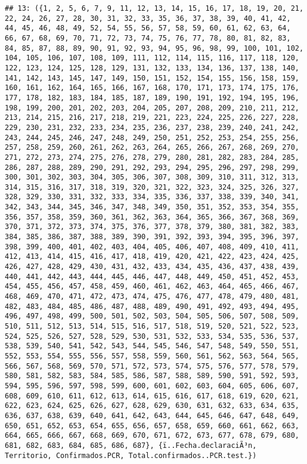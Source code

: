 \documentclass[
]{book}
\begin{document}
\begin{verbatim}
## 13: ({1, 2, 5, 6, 7, 9, 11, 12, 13, 14, 15, 16, 17, 18, 19, 20, 21, 22, 24, 26, 27, 28, 30, 31, 32, 33, 35, 36, 37, 38, 39, 40, 41, 42, 44, 45, 46, 48, 49, 52, 54, 55, 56, 57, 58, 59, 60, 61, 62, 63, 64, 66, 67, 68, 69, 70, 71, 72, 73, 74, 75, 76, 77, 78, 80, 81, 82, 83, 84, 85, 87, 88, 89, 90, 91, 92, 93, 94, 95, 96, 98, 99, 100, 101, 102, 104, 105, 106, 107, 108, 109, 111, 112, 114, 115, 116, 117, 118, 120, 122, 123, 124, 125, 128, 129, 131, 132, 133, 134, 136, 137, 138, 140, 141, 142, 143, 145, 147, 149, 150, 151, 152, 154, 155, 156, 158, 159, 160, 161, 162, 164, 165, 166, 167, 168, 170, 171, 173, 174, 175, 176, 177, 178, 182, 183, 184, 185, 187, 189, 190, 191, 192, 194, 195, 196, 198, 199, 200, 201, 202, 203, 204, 205, 207, 208, 209, 210, 211, 212, 213, 214, 215, 216, 217, 218, 219, 221, 223, 224, 225, 226, 227, 228, 229, 230, 231, 232, 233, 234, 235, 236, 237, 238, 239, 240, 241, 242, 243, 244, 245, 246, 247, 248, 249, 250, 251, 252, 253, 254, 255, 256, 257, 258, 259, 260, 261, 262, 263, 264, 265, 266, 267, 268, 269, 270, 271, 272, 273, 274, 275, 276, 278, 279, 280, 281, 282, 283, 284, 285, 286, 287, 288, 289, 290, 291, 292, 293, 294, 295, 296, 297, 298, 299, 300, 301, 302, 303, 304, 305, 306, 307, 308, 309, 310, 311, 312, 313, 314, 315, 316, 317, 318, 319, 320, 321, 322, 323, 324, 325, 326, 327, 328, 329, 330, 331, 332, 333, 334, 335, 336, 337, 338, 339, 340, 341, 342, 343, 344, 345, 346, 347, 348, 349, 350, 351, 352, 353, 354, 355, 356, 357, 358, 359, 360, 361, 362, 363, 364, 365, 366, 367, 368, 369, 370, 371, 372, 373, 374, 375, 376, 377, 378, 379, 380, 381, 382, 383, 384, 385, 386, 387, 388, 389, 390, 391, 392, 393, 394, 395, 396, 397, 398, 399, 400, 401, 402, 403, 404, 405, 406, 407, 408, 409, 410, 411, 412, 413, 414, 415, 416, 417, 418, 419, 420, 421, 422, 423, 424, 425, 426, 427, 428, 429, 430, 431, 432, 433, 434, 435, 436, 437, 438, 439, 440, 441, 442, 443, 444, 445, 446, 447, 448, 449, 450, 451, 452, 453, 454, 455, 456, 457, 458, 459, 460, 461, 462, 463, 464, 465, 466, 467, 468, 469, 470, 471, 472, 473, 474, 475, 476, 477, 478, 479, 480, 481, 482, 483, 484, 485, 486, 487, 488, 489, 490, 491, 492, 493, 494, 495, 496, 497, 498, 499, 500, 501, 502, 503, 504, 505, 506, 507, 508, 509, 510, 511, 512, 513, 514, 515, 516, 517, 518, 519, 520, 521, 522, 523, 524, 525, 526, 527, 528, 529, 530, 531, 532, 533, 534, 535, 536, 537, 538, 539, 540, 541, 542, 543, 544, 545, 546, 547, 548, 549, 550, 551, 552, 553, 554, 555, 556, 557, 558, 559, 560, 561, 562, 563, 564, 565, 566, 567, 568, 569, 570, 571, 572, 573, 574, 575, 576, 577, 578, 579, 580, 581, 582, 583, 584, 585, 586, 587, 588, 589, 590, 591, 592, 593, 594, 595, 596, 597, 598, 599, 600, 601, 602, 603, 604, 605, 606, 607, 608, 609, 610, 611, 612, 613, 614, 615, 616, 617, 618, 619, 620, 621, 622, 623, 624, 625, 626, 627, 628, 629, 630, 631, 632, 633, 634, 635, 636, 637, 638, 639, 640, 641, 642, 643, 644, 645, 646, 647, 648, 649, 650, 651, 652, 653, 654, 655, 656, 657, 658, 659, 660, 661, 662, 663, 664, 665, 666, 667, 668, 669, 670, 671, 672, 673, 677, 678, 679, 680, 681, 682, 683, 684, 685, 686, 687}, {ï..Fecha.declaraciÃ³n, Territorio, Confirmados.PCR, Total.confirmados..PCR.test.})

\end{verbatim}
\end{document}

